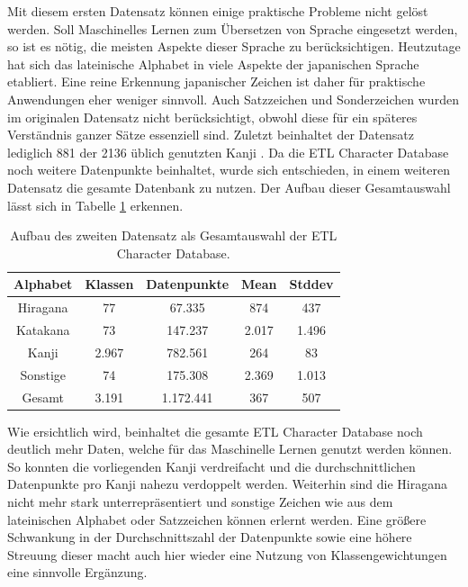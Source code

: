 \documentclass[twoside,a4paper]{IEEEtran}
\begin{document}
Mit diesem ersten Datensatz können einige praktische Probleme nicht gelöst werden. Soll Maschinelles Lernen zum Übersetzen von Sprache eingesetzt werden, so ist es nötig, die meisten Aspekte dieser Sprache zu berücksichtigen. Heutzutage hat sich das lateinische Alphabet in viele Aspekte der japanischen Sprache etabliert. Eine reine Erkennung japanischer Zeichen ist daher für praktische Anwendungen eher weniger sinnvoll. Auch Satzzeichen und Sonderzeichen wurden im originalen Datensatz nicht berücksichtigt, obwohl diese für ein späteres Verständnis ganzer Sätze essenziell sind. Zuletzt beinhaltet der Datensatz lediglich 881 der 2136 üblich genutzten Kanji \cite[S.3]{RHC}. Da die ETL Character Database noch weitere Datenpunkte beinhaltet, wurde sich entschieden, in einem weiteren Datensatz die gesamte Datenbank zu nutzen. Der Aufbau dieser Gesamtauswahl lässt sich in Tabelle \ref{data_total} erkennen.

\begin{table}[!htb]
	\caption{Aufbau des zweiten Datensatz als Gesamtauswahl der ETL Character Database.}
	\label{data_total}
	\centering
	\begin{tabular}{|c|c|c|c|c|}
		\hline
		Alphabet & Klassen & Datenpunkte & Mean & Stddev\\
		\hline
		\hline
		Hiragana & 77 & 67.335 & 874 & 437\\
		\hline 
		Katakana & 73 & 147.237 & 2.017 & 1.496\\
		\hline
		Kanji & 2.967 & 782.561 & 264 & 83\\
		\hline
		Sonstige & 74 & 175.308 & 2.369 & 1.013\\
		\hline
		\hline
		Gesamt & 3.191 & 1.172.441 & 367 & 507\\
		\hline
	\end{tabular}
\end{table}
Wie ersichtlich wird, beinhaltet die gesamte ETL Character Database noch deutlich mehr Daten, welche für das Maschinelle Lernen genutzt werden können. So konnten die vorliegenden Kanji verdreifacht und die durchschnittlichen Datenpunkte pro Kanji nahezu verdoppelt werden. Weiterhin sind die Hiragana nicht mehr stark unterrepräsentiert und sonstige Zeichen wie aus dem lateinischen Alphabet oder Satzzeichen können erlernt werden. Eine größere Schwankung in der Durchschnittszahl der Datenpunkte sowie eine höhere Streuung dieser macht auch hier wieder eine Nutzung von Klassengewichtungen eine sinnvolle Ergänzung.
\end{document}
